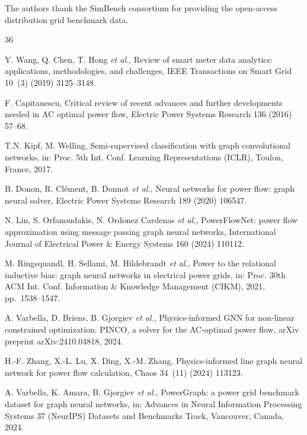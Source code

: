\documentclass[preprint,review,12pt]{elsarticle}
\begin{document}
The authors thank the SimBench consortium for providing the open-access distribution grid benchmark data.



\begin{thebibliography}{36}

 Y. Wang, Q. Chen, T. Hong \emph{et al.}, Review of smart meter data analytics: applications, methodologies, and challenges, IEEE Transactions on Smart Grid 10~(3) (2019) 3125--3148.

 F. Capitanescu, Critical review of recent advances and further developments needed in AC optimal power flow, Electric Power Systems Research 136 (2016) 57--68.

 T.N. Kipf, M. Welling, Semi-supervised classification with graph convolutional networks, in: Proc. 5th Int. Conf. Learning Representations (ICLR), Toulon, France, 2017.

 B. Donon, R. Cl\'{e}ment, B. Donnot \emph{et al.}, Neural networks for power flow: graph neural solver, Electric Power Systems Research 189 (2020) 106547.

 N. Lin, S. Orfanoudakis, N. Ordonez Cardenas \emph{et al.}, PowerFlowNet: power flow approximation using message passing graph neural networks, International Journal of Electrical Power \& Energy Systems 160 (2024) 110112.

 M. Ringsquandl, H. Sellami, M. Hildebrandt \emph{et al.}, Power to the relational inductive bias: graph neural networks in electrical power grids, in: Proc. 30th ACM Int. Conf. Information \& Knowledge Management (CIKM), 2021, pp.~1538--1547.

 A. Varbella, D. Briens, B. Gjorgiev \emph{et al.}, Physics-informed GNN for non-linear constrained optimization: PINCO, a solver for the AC-optimal power flow, arXiv preprint arXiv:2410.04818, 2024.

 H.-F. Zhang, X.-L. Lu, X. Ding, X.-M. Zhang, Physics-informed line graph neural network for power flow calculation, Chaos 34~(11) (2024) 113123.

 A. Varbella, K. Amara, B. Gjorgiev \emph{et al.}, PowerGraph: a power grid benchmark dataset for graph neural networks, in: Advances in Neural Information Processing Systems 37 (NeurIPS) Datasets and Benchmarks Track, Vancouver, Canada, 2024.


\end{thebibliography}
\end{document}
